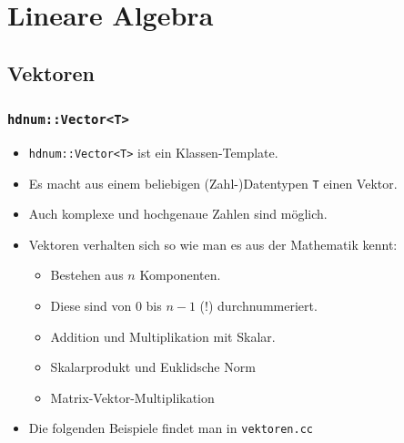 \documentclass[a4paper,11pt]{article}
\theoremstyle{definition}
\begin{document}
%

\section{Lineare Algebra}

\subsection{Vektoren}

\begin{frame}[fragile]
\frametitle{\lstinline{hdnum::Vector<T>}}
\begin{itemize}
\item \lstinline{hdnum::Vector<T>} ist ein Klassen-Template.
\item Es macht aus einem beliebigen (Zahl-)Datentypen \lstinline{T}
  einen Vektor.
\item Auch komplexe und hochgenaue Zahlen sind möglich.
\item Vektoren verhalten sich so wie man es aus der Mathematik kennt:
\begin{itemize}
\item Bestehen aus $n$ Komponenten.
\item Diese sind von $0$ bis $n-1$ (!) durchnummeriert.
\item Addition und Multiplikation mit Skalar.
\item Skalarprodukt und Euklidsche Norm
\item Matrix-Vektor-Multiplikation
\end{itemize}
\item Die folgenden Beispiele findet man in \lstinline{vektoren.cc}
\end{itemize}
\end{frame}
\end{document}
